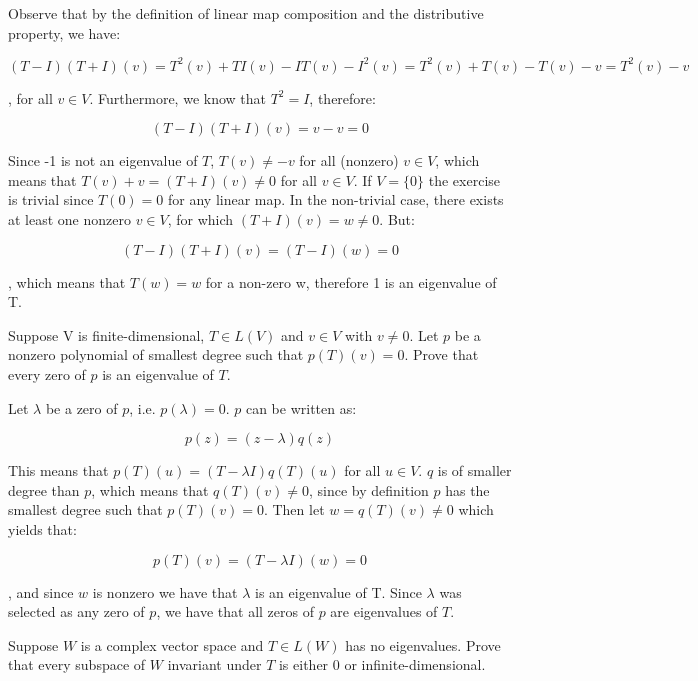 \begin{solution}

Observe that by the definition of linear map composition and the distributive property, we have:

$$(T - I)(T + I)(v) = T^2(v) + TI(v) -IT(v) -I^2(v) = T^2(v) + T(v) - T(v) - v = T^2(v) - v$$

, for all $v \in V$. Furthermore, we know that $T^2 = I$, therefore:

$$(T - I)(T + I)(v) = v - v = 0$$

Since -1 is not an eigenvalue of $T$, $T(v) \neq -v$ for all (nonzero) $v \in V$, which means that $T(v) + v = (T + I)(v) \neq 0$ for all $v \in V$. If $V = \{0\}$ the exercise is trivial since $T(0) = 0$ for any linear map. In the non-trivial case, there exists at least one nonzero $v \in V$, for which $(T + I)(v) = w \neq 0$. But:

$$(T - I)(T + I)(v) = (T - I)(w) = 0$$

, which means that $T(w) = w$ for a non-zero w, therefore 1 is an eigenvalue of T.

\end{solution}

\begin{exercise}{9}
Suppose V is finite-dimensional, $T \in L(V)$ and $v \in V$ with $v \neq 0$. Let $p$ be a nonzero polynomial of smallest degree such that $p(T)(v) = 0$. Prove that every zero of $p$ is an eigenvalue of $T$.
\end{exercise}

\begin{solution}

Let $\lambda$ be a zero of $p$, i.e. $p(\lambda) = 0$. $p$ can be written as:

$$p(z) = (z - \lambda)q(z)$$

This means that $p(T)(u) = (T - \lambda I)q(T)(u)$ for  all $u \in V$. $q$ is of smaller degree than $p$, which means that $q(T)(v) \neq 0$, since by definition $p$ has the smallest degree such that $p(T)(v) = 0$. Then let $w = q(T)(v) \neq 0$ which yields that:

$$p(T)(v) = (T - \lambda I)(w) = 0$$

, and since $w$ is nonzero we have that $\lambda$ is an eigenvalue of T. Since $\lambda$ was selected as any zero of $p$, we have that all zeros of $p$ are eigenvalues of $T$.
\end{solution}

\begin{exercise}{13}
Suppose $W$ is a complex vector space and $T \in L(W)$ has no eigenvalues. Prove that every subspace of $W$ invariant under $T$ is either ${0}$ or infinite-dimensional.
\end{exercise}

